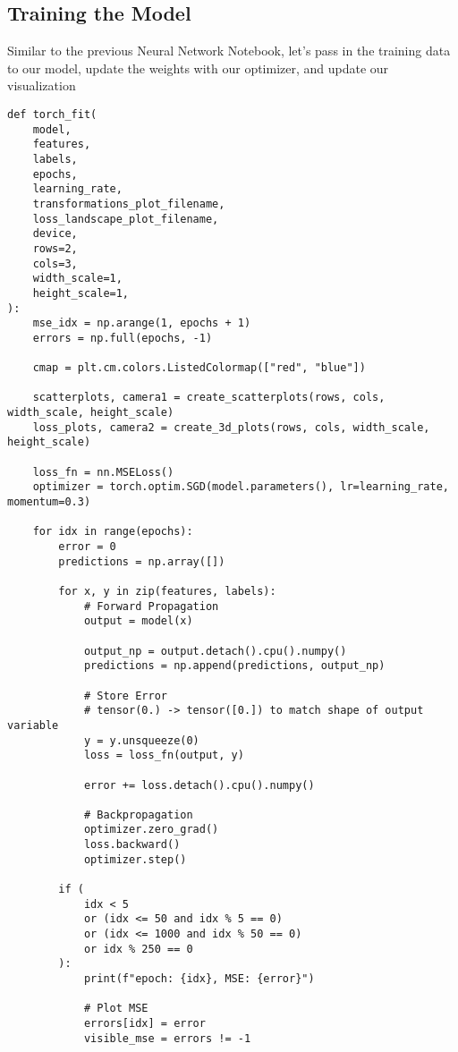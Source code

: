 \documentclass[openany]{book}
\begin{document}
    \subsection{Training the Model}\label{training-the-model}

Similar to the previous Neural Network Notebook, let's pass in the
training data to our model, update the weights with our optimizer, and
update our visualization

\begin{tcolorbox}
\tiny
\begin{verbatim}
def torch_fit(
    model,
    features,
    labels,
    epochs,
    learning_rate,
    transformations_plot_filename,
    loss_landscape_plot_filename,
    device,
    rows=2,
    cols=3,
    width_scale=1,
    height_scale=1,
):
    mse_idx = np.arange(1, epochs + 1)
    errors = np.full(epochs, -1)

    cmap = plt.cm.colors.ListedColormap(["red", "blue"])

    scatterplots, camera1 = create_scatterplots(rows, cols, width_scale, height_scale)
    loss_plots, camera2 = create_3d_plots(rows, cols, width_scale, height_scale)

    loss_fn = nn.MSELoss()
    optimizer = torch.optim.SGD(model.parameters(), lr=learning_rate, momentum=0.3)

    for idx in range(epochs):
        error = 0
        predictions = np.array([])

        for x, y in zip(features, labels):
            # Forward Propagation
            output = model(x)

            output_np = output.detach().cpu().numpy()
            predictions = np.append(predictions, output_np)

            # Store Error
            # tensor(0.) -> tensor([0.]) to match shape of output variable
            y = y.unsqueeze(0)
            loss = loss_fn(output, y)

            error += loss.detach().cpu().numpy()

            # Backpropagation
            optimizer.zero_grad()
            loss.backward()
            optimizer.step()

        if (
            idx < 5
            or (idx <= 50 and idx % 5 == 0)
            or (idx <= 1000 and idx % 50 == 0)
            or idx % 250 == 0
        ):
            print(f"epoch: {idx}, MSE: {error}")

            # Plot MSE
            errors[idx] = error
            visible_mse = errors != -1


\end{verbatim}
\end{tcolorbox}
\end{document}
